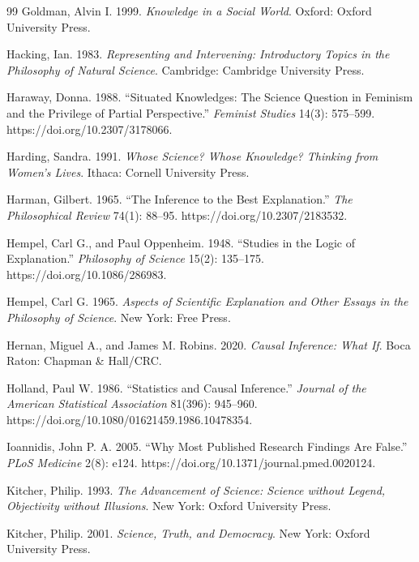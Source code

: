 \begin{thebibliography}{99}
Goldman, Alvin I. 1999. \emph{Knowledge in a Social World}. Oxford: Oxford University Press.

Hacking, Ian. 1983. \emph{Representing and Intervening: Introductory Topics in the Philosophy of Natural Science}. Cambridge: Cambridge University Press.

Haraway, Donna. 1988. \enquote{Situated Knowledges: The Science Question in Feminism and the Privilege of Partial Perspective.} \emph{Feminist Studies} 14(3): 575--599. https://doi.org/10.2307/3178066.

Harding, Sandra. 1991. \emph{Whose Science? Whose Knowledge? Thinking from Women's Lives}. Ithaca: Cornell University Press.

Harman, Gilbert. 1965. \enquote{The Inference to the Best Explanation.} \emph{The Philosophical Review} 74(1): 88--95. https://doi.org/10.2307/2183532.

Hempel, Carl G., and Paul Oppenheim. 1948. \enquote{Studies in the Logic of Explanation.} \emph{Philosophy of Science} 15(2): 135--175. https://doi.org/10.1086/286983.

Hempel, Carl G. 1965. \emph{Aspects of Scientific Explanation and Other Essays in the Philosophy of Science}. New York: Free Press.

Hernan, Miguel A., and James M. Robins. 2020. \emph{Causal Inference: What If}. Boca Raton: Chapman \& Hall/CRC.

Holland, Paul W. 1986. \enquote{Statistics and Causal Inference.} \emph{Journal of the American Statistical Association} 81(396): 945--960. https://doi.org/10.1080/01621459.1986.10478354.

Ioannidis, John P. A. 2005. \enquote{Why Most Published Research Findings Are False.} \emph{PLoS Medicine} 2(8): e124. https://doi.org/10.1371/journal.pmed.0020124.

Kitcher, Philip. 1993. \emph{The Advancement of Science: Science without Legend, Objectivity without Illusions}. New York: Oxford University Press.

Kitcher, Philip. 2001. \emph{Science, Truth, and Democracy}. New York: Oxford University Press.


\end{thebibliography}
